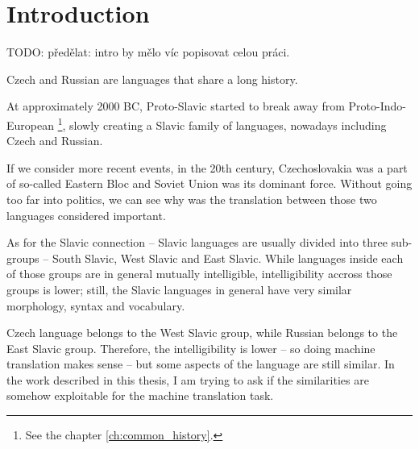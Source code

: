\chapter*{Introduction}

TODO: předělat: intro by mělo víc popisovat celou práci.

Czech and Russian are languages that share a long history.

At approximately 2000 BC, Proto-Slavic started to break away from Proto-Indo-European
\footnote{See the chapter \ref{ch:common_history}.}, slowly creating a Slavic family of languages, nowadays including Czech and Russian.

If we consider more recent events, in the 20th century, Czechoslovakia was a part of so-called Eastern Bloc and Soviet Union was its dominant force. Without going too far into politics, we can see why was the translation between those two languages considered important.

As for the Slavic connection -- Slavic languages are usually divided into three sub-groups -- South Slavic, West Slavic and East Slavic. While languages inside each of those groups are in general mutually intelligible, intelligibility accross those groups is lower; still, the Slavic languages in general have very similar morphology, syntax and vocabulary. 

Czech language belongs to the West Slavic group, while Russian belongs to the East Slavic group. Therefore, the intelligibility is lower -- so doing machine translation makes sense -- but some aspects of the language are still similar. In the work described in this thesis, I am trying to ask if the similarities are somehow exploitable for the machine translation task.


